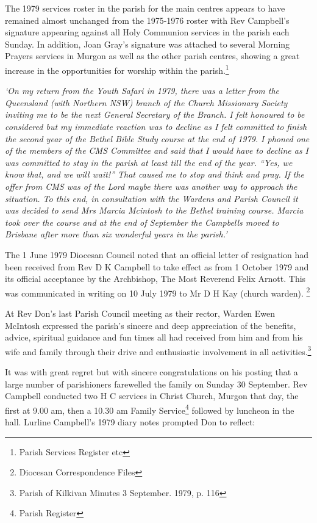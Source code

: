 The 1979 services roster in the parish for the main centres appears to have remained almost unchanged from the 1975-1976 roster with Rev Campbell's signature appearing against all Holy Communion services in the parish each Sunday. In addition, Joan Gray's signature was attached to several Morning Prayers services in Murgon as well as the other parish centres, showing a great increase in the opportunities for worship within the parish.\footnote{Parish Services Register etc}


\emph{`On my return from the Youth Safari in 1979, there was a letter from the Queensland (with Northern NSW) branch of the Church Missionary Society inviting me to be the next General Secretary of the Branch. I felt honoured to be considered but my immediate reaction was to decline as I felt committed to finish the second year of the Bethel Bible Study course at the end of 1979. I phoned one of the members of the CMS Committee and said that I would have to decline as I was committed to stay in the parish at least till the end of the year. ``Yes, we know that, and we will wait!'' That caused me to stop and think and pray. If the offer from CMS was of the Lord maybe there was another way to approach the situation. To this end, in consultation with the Wardens and Parish Council it was decided to send Mrs Marcia Mcintosh to the Bethel training course. Marcia took over the course and at the end of September the Campbells moved to Brisbane after more than six wonderful years in the parish.'}



The 1 June 1979 Diocesan Council noted that an official letter of resignation had been received from Rev D K Campbell to take effect as from 1 October 1979 and its official acceptance by the Archbishop, The Most Reverend Felix Arnott. This was communicated in writing on 10 July 1979 to Mr D H Kay (church warden). \footnote{Diocesan Correspondence Files}


At Rev Don's last Parish Council meeting as their rector, Warden Ewen McIntosh expressed the parish's sincere and deep appreciation of the benefits, advice, spiritual guidance and fun times all had received from him and from his wife and family through their drive and enthusiastic involvement in all activities.\footnote{Parish of Kilkivan Minutes 3 September. 1979, p. 116}


It was with great regret but with sincere congratulations on his posting that a large number of parishioners farewelled the family on Sunday 30 September. Rev Campbell conducted two H C services in Christ Church, Murgon that day, the first at 9.00 am, then a 10.30 am Family Service\footnote{Parish Register} followed by luncheon in the hall. Lurline Campbell's 1979 diary notes prompted Don to reflect:


